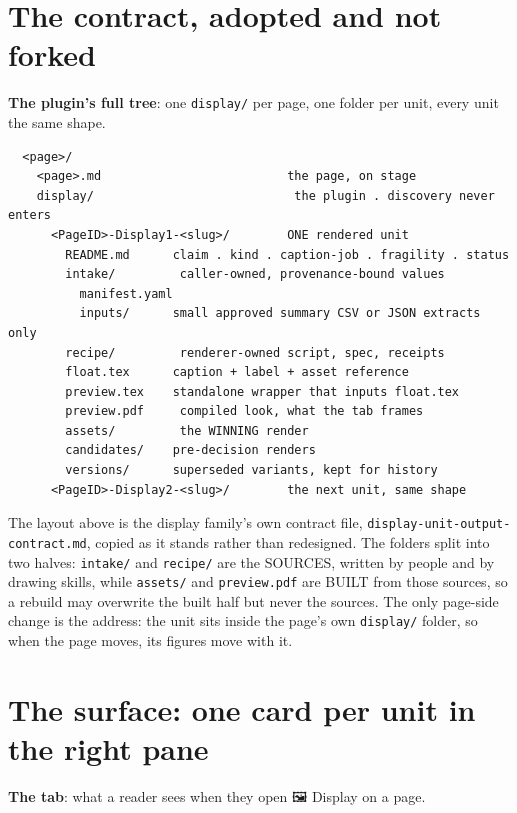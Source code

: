 
\section{The contract, adopted and not forked}
\textbf{The plugin's full tree}: one \texttt{display/} per page, one folder per unit, every unit the same shape.

\begin{verbatim}
  <page>/
    <page>.md                          the page, on stage
    display/                            the plugin . discovery never enters
      <PageID>-Display1-<slug>/        ONE rendered unit
        README.md      claim . kind . caption-job . fragility . status
        intake/         caller-owned, provenance-bound values
          manifest.yaml
          inputs/      small approved summary CSV or JSON extracts only
        recipe/         renderer-owned script, spec, receipts
        float.tex      caption + label + asset reference
        preview.tex    standalone wrapper that inputs float.tex
        preview.pdf     compiled look, what the tab frames
        assets/         the WINNING render
        candidates/    pre-decision renders
        versions/      superseded variants, kept for history
      <PageID>-Display2-<slug>/        the next unit, same shape
\end{verbatim}
The layout above is the display family's own contract file, \texttt{display-unit-output-contract.md}, copied as it stands rather than redesigned. The folders split into two halves: \texttt{intake/} and \texttt{recipe/} are the SOURCES, written by people and by drawing skills, while \texttt{assets/} and \texttt{preview.pdf} are BUILT from those sources, so a rebuild may overwrite the built half but never the sources. The only page-side change is the address: the unit sits inside the page's own \texttt{display/} folder, so when the page moves, its figures move with it.


\section{The surface: one card per unit in the right pane}
\textbf{The tab}: what a reader sees when they open 🖼 Display on a page.

